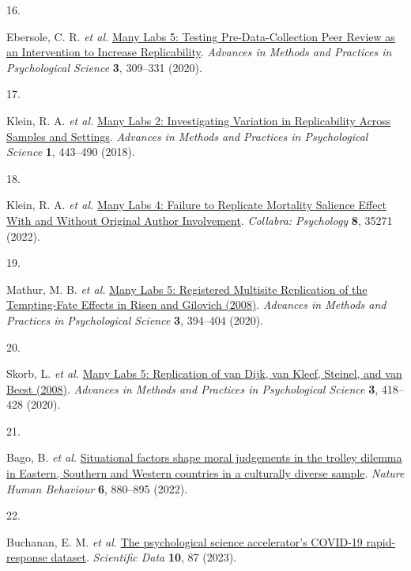 \documentclass[
  man,floatsintext]{apa6}
\newlength{\cslhangindent}
\newlength{\csllabelwidth}
\newlength{\cslentryspacingunit} %
\newenvironment{CSLReferences}[2] %
 {%
  \setlength{\parindent}{0pt}
  \ifodd #1
  \let\oldpar\par
  \def\par{\hangindent=\cslhangindent\oldpar}
  \fi
  \setlength{\parskip}{#2\cslentryspacingunit}
 }%
 {}
\newcommand{\CSLLeftMargin}[1]{\parbox[t]{\csllabelwidth}{#1}}
\newcommand{\CSLRightInline}[1]{\parbox[t]{\linewidth - \csllabelwidth}{#1}\break}
\begin{document}
\begin{CSLReferences}{0}{0}
\leavevmode{}%
\CSLLeftMargin{16. }%
\CSLRightInline{Ebersole, C. R. \emph{et al.} \href{https://doi.org/10.1177/2515245920958687}{Many Labs 5: Testing Pre-Data-Collection Peer Review as an Intervention to Increase Replicability}. \emph{Advances in Methods and Practices in Psychological Science} \textbf{3}, 309--331 (2020).}

\leavevmode{}%
\CSLLeftMargin{17. }%
\CSLRightInline{Klein, R. A. \emph{et al.} \href{https://doi.org/10.1177/2515245918810225}{Many Labs 2: Investigating Variation in Replicability Across Samples and Settings}. \emph{Advances in Methods and Practices in Psychological Science} \textbf{1}, 443--490 (2018).}

\leavevmode{}%
\CSLLeftMargin{18. }%
\CSLRightInline{Klein, R. A. \emph{et al.} \href{https://doi.org/10.1525/collabra.35271}{Many Labs 4: Failure to Replicate Mortality Salience Effect With and Without Original Author Involvement}. \emph{Collabra: Psychology} \textbf{8}, 35271 (2022).}

\leavevmode{}%
\CSLLeftMargin{19. }%
\CSLRightInline{Mathur, M. B. \emph{et al.} \href{https://doi.org/10.1177/2515245918785165}{Many Labs 5: Registered Multisite Replication of the Tempting-Fate Effects in Risen and Gilovich (2008)}. \emph{Advances in Methods and Practices in Psychological Science} \textbf{3}, 394--404 (2020).}

\leavevmode{}%
\CSLLeftMargin{20. }%
\CSLRightInline{Skorb, L. \emph{et al.} \href{https://doi.org/10.1177/2515245920927643}{Many Labs 5: Replication of van Dijk, van Kleef, Steinel, and van Beest (2008)}. \emph{Advances in Methods and Practices in Psychological Science} \textbf{3}, 418--428 (2020).}

\leavevmode{}%
\CSLLeftMargin{21. }%
\CSLRightInline{Bago, B. \emph{et al.} \href{https://doi.org/10.1038/s41562-022-01319-5}{Situational factors shape moral judgements in the trolley dilemma in Eastern, Southern and Western countries in a culturally diverse sample}. \emph{Nature Human Behaviour} \textbf{6}, 880--895 (2022).}

\leavevmode{}%
\CSLLeftMargin{22. }%
\CSLRightInline{Buchanan, E. M. \emph{et al.} \href{https://doi.org/10.1038/s41597-022-01811-7}{The psychological science accelerator{'}s COVID-19 rapid-response dataset}. \emph{Scientific Data} \textbf{10}, 87 (2023).}


\end{CSLReferences}
\end{document}
